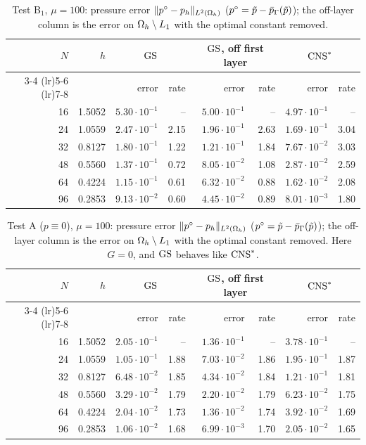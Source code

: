 \begin{table}[t]
\centering
\caption{Test B$_1$, $\mu=100$: pressure error $\lVert p^\circ-p_h\rVert_{L^2(\Omega_h)}$ ($p^\circ=\tilde p-\bar p_{\Gamma}(\tilde p)$); the off-layer column is the error on $\Omega_h\setminus L_1$ with the optimal constant removed.}\label{tab:pB1}
\small
\begin{tabular}{rrrrrrrr}
\toprule
$N$ & $h$ & \multicolumn{2}{c}{$\mathrm{GS}$} & \multicolumn{2}{c}{$\mathrm{GS}$, off first layer} & \multicolumn{2}{c}{$\mathrm{CNS}^\ast$}\\
\cmidrule(lr){3-4} \cmidrule(lr){5-6} \cmidrule(lr){7-8}
 & & error & rate & error & rate & error & rate\\
\midrule
16 & 1.5052 & $5.30\cdot10^{-1}$ & -- & $5.00\cdot10^{-1}$ & -- & $4.97\cdot10^{-1}$ & --\\
24 & 1.0559 & $2.47\cdot10^{-1}$ & 2.15 & $1.96\cdot10^{-1}$ & 2.63 & $1.69\cdot10^{-1}$ & 3.04\\
32 & 0.8127 & $1.80\cdot10^{-1}$ & 1.22 & $1.21\cdot10^{-1}$ & 1.84 & $7.67\cdot10^{-2}$ & 3.03\\
48 & 0.5560 & $1.37\cdot10^{-1}$ & 0.72 & $8.05\cdot10^{-2}$ & 1.08 & $2.87\cdot10^{-2}$ & 2.59\\
64 & 0.4224 & $1.15\cdot10^{-1}$ & 0.61 & $6.32\cdot10^{-2}$ & 0.88 & $1.62\cdot10^{-2}$ & 2.08\\
96 & 0.2853 & $9.13\cdot10^{-2}$ & 0.60 & $4.45\cdot10^{-2}$ & 0.89 & $8.01\cdot10^{-3}$ & 1.80\\
\bottomrule
\end{tabular}
\end{table}
\begin{table}[t]
\centering
\caption{Test A ($p\equiv0$), $\mu=100$: pressure error $\lVert p^\circ-p_h\rVert_{L^2(\Omega_h)}$ ($p^\circ=\tilde p-\bar p_{\Gamma}(\tilde p)$); the off-layer column is the error on $\Omega_h\setminus L_1$ with the optimal constant removed. Here $G=0$, and $\mathrm{GS}$ behaves like $\mathrm{CNS}^\ast$.}\label{tab:pA}
\small
\begin{tabular}{rrrrrrrr}
\toprule
$N$ & $h$ & \multicolumn{2}{c}{$\mathrm{GS}$} & \multicolumn{2}{c}{$\mathrm{GS}$, off first layer} & \multicolumn{2}{c}{$\mathrm{CNS}^\ast$}\\
\cmidrule(lr){3-4} \cmidrule(lr){5-6} \cmidrule(lr){7-8}
 & & error & rate & error & rate & error & rate\\
\midrule
16 & 1.5052 & $2.05\cdot10^{-1}$ & -- & $1.36\cdot10^{-1}$ & -- & $3.78\cdot10^{-1}$ & --\\
24 & 1.0559 & $1.05\cdot10^{-1}$ & 1.88 & $7.03\cdot10^{-2}$ & 1.86 & $1.95\cdot10^{-1}$ & 1.87\\
32 & 0.8127 & $6.48\cdot10^{-2}$ & 1.85 & $4.34\cdot10^{-2}$ & 1.84 & $1.21\cdot10^{-1}$ & 1.81\\
48 & 0.5560 & $3.29\cdot10^{-2}$ & 1.79 & $2.20\cdot10^{-2}$ & 1.79 & $6.23\cdot10^{-2}$ & 1.75\\
64 & 0.4224 & $2.04\cdot10^{-2}$ & 1.73 & $1.36\cdot10^{-2}$ & 1.74 & $3.92\cdot10^{-2}$ & 1.69\\
96 & 0.2853 & $1.06\cdot10^{-2}$ & 1.68 & $6.99\cdot10^{-3}$ & 1.70 & $2.05\cdot10^{-2}$ & 1.65\\
\bottomrule
\end{tabular}
\end{table}

